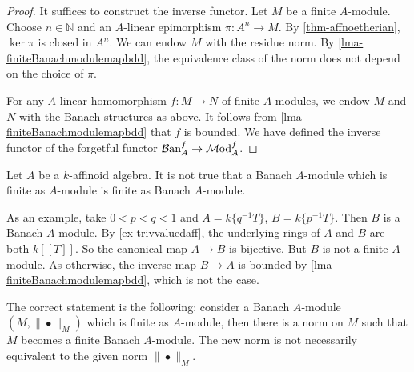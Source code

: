 \begin{proof}
    It suffices to construct the inverse functor. Let $M$ be a finite $A$-module. Choose $n\in \mathbb{N}$ and an $A$-linear epimorphism $\pi:A^n\rightarrow M$. By \cref{thm-affnoetherian}, $\ker \pi$ is closed in $A^n$. We can endow $M$ with the residue norm. By \cref{lma-finiteBanachmodulemapbdd}, the equivalence class of the norm does not depend on the choice of $\pi$.

    For any $A$-linear homomorphism $f:M\rightarrow N$ of finite $A$-modules, we endow $M$ and $N$ with the Banach structures as above. It follows from \cref{lma-finiteBanachmodulemapbdd} that $f$ is bounded. We have defined the inverse functor of the forgetful functor  $\mathcal{B}\mathrm{an}_A^f\rightarrow \mathcal{M}\mathrm{od}_A^f$.
\end{proof}
\begin{remark}Let $A$ be a $k$-affinoid algebra. 
    It is not true that a Banach $A$-module which is finite as $A$-module is finite as Banach $A$-module. 

    As an example, take $0<p<q<1$ and $A=k\{q^{-1}T\}$, $B=k\{p^{-1}T\}$. Then $B$ is a Banach $A$-module.
    By \cref{ex-trivvaluedaff}, the underlying rings of $A$ and $B$ are both $k[[T]]$. So the canonical map $A\rightarrow B$ is bijective. But $B$ is not a finite $A$-module. As otherwise, the inverse map $B\rightarrow A$ is bounded by \cref{lma-finiteBanachmodulemapbdd}, which is not the case.

    The correct statement is the following: consider a Banach $A$-module $(M,\|\bullet\|_M)$ which is finite as $A$-module, then there is a norm on $M$ such that $M$ becomes a finite Banach $A$-module. The new norm is not necessarily equivalent to the given norm $\|\bullet\|_M$.
\end{remark}


